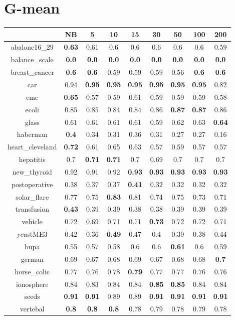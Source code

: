 \documentclass{article}%
\begin{document}
%
\section*{G{-}mean}%
\begin{tabular}{c|cccccccc}%
\hline%
&NB&5&10&15&30&50&100&200\\%
\hline%
abalone16\_29&\textbf{0.63}&0.61&0.6&0.6&0.6&0.6&0.6&0.59\\%
\hline%
balance\_scale&\textbf{0.0}&\textbf{0.0}&\textbf{0.0}&\textbf{0.0}&\textbf{0.0}&\textbf{0.0}&\textbf{0.0}&\textbf{0.0}\\%
\hline%
breast\_cancer&\textbf{0.6}&\textbf{0.6}&0.59&0.59&0.59&0.56&\textbf{0.6}&\textbf{0.6}\\%
\hline%
car&0.94&\textbf{0.95}&\textbf{0.95}&\textbf{0.95}&\textbf{0.95}&\textbf{0.95}&\textbf{0.95}&0.82\\%
\hline%
cmc&\textbf{0.65}&0.57&0.59&0.61&0.59&0.59&0.59&0.58\\%
\hline%
ecoli&0.85&0.85&0.84&0.84&0.86&\textbf{0.87}&\textbf{0.87}&0.86\\%
\hline%
glass&0.61&0.61&0.61&0.61&0.59&0.62&0.63&\textbf{0.64}\\%
\hline%
haberman&\textbf{0.4}&0.34&0.31&0.36&0.31&0.27&0.27&0.16\\%
\hline%
heart\_cleveland&\textbf{0.72}&0.61&0.65&0.63&0.57&0.59&0.57&0.57\\%
\hline%
hepatitis&0.7&\textbf{0.71}&\textbf{0.71}&0.7&0.69&0.7&0.7&0.7\\%
\hline%
new\_thyroid&0.92&0.91&0.92&\textbf{0.93}&\textbf{0.93}&\textbf{0.93}&\textbf{0.93}&\textbf{0.93}\\%
\hline%
postoperative&0.38&0.37&0.37&\textbf{0.41}&0.32&0.32&0.32&0.32\\%
\hline%
solar\_flare&0.77&0.75&\textbf{0.83}&0.81&0.74&0.75&0.73&0.71\\%
\hline%
transfusion&\textbf{0.43}&0.39&0.39&0.38&0.38&0.39&0.39&0.39\\%
\hline%
vehicle&0.72&0.69&0.71&0.71&\textbf{0.73}&0.72&0.72&0.71\\%
\hline%
yeastME3&0.42&0.36&\textbf{0.49}&0.47&0.4&0.39&0.38&0.44\\%
\hline%
bupa&0.55&0.57&0.58&0.6&0.6&\textbf{0.61}&0.6&0.59\\%
\hline%
german&0.69&0.67&0.68&0.69&0.67&0.68&0.68&\textbf{0.7}\\%
\hline%
horse\_colic&0.77&0.76&0.78&\textbf{0.79}&0.77&0.77&0.76&0.76\\%
\hline%
ionosphere&0.84&0.83&0.84&0.84&\textbf{0.85}&\textbf{0.85}&0.84&0.84\\%
\hline%
seeds&\textbf{0.91}&\textbf{0.91}&0.89&0.89&\textbf{0.91}&\textbf{0.91}&\textbf{0.91}&\textbf{0.91}\\%
\hline%
vertebal&\textbf{0.8}&\textbf{0.8}&\textbf{0.8}&0.78&0.79&0.78&0.79&0.78\\%
\hline%
\end{tabular}

%
\end{document}

